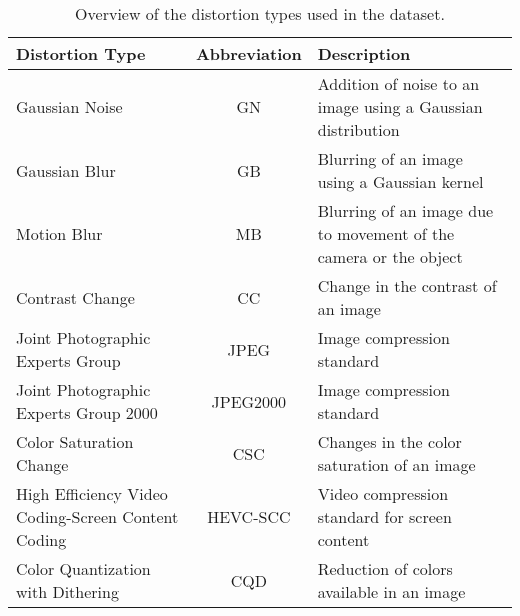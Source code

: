 \begin{table}[h!]
\centering
\caption{Overview of the distortion types used in the dataset.}
\begin{tabular}{|p{6cm}|c|p{6cm}|}
\hline
\textbf{Distortion Type} & \textbf{Abbreviation} & \textbf{Description} \\
\hline
\hline
Gaussian Noise & GN & Addition of noise to an image using a Gaussian distribution \\
\hline
Gaussian Blur & GB & Blurring of an image using a Gaussian kernel \\
\hline
Motion Blur & MB & Blurring of an image due to movement of the camera or the object \\
\hline
Contrast Change & CC & Change in the contrast of an image \\
\hline
Joint Photographic Experts Group & JPEG & Image compression standard \\
\hline
Joint Photographic Experts Group 2000 & JPEG2000 & Image compression standard \\
\hline
Color Saturation Change & CSC & Changes in the color saturation of an image \\
\hline
High Efficiency Video Coding-Screen Content Coding & HEVC-SCC & Video compression standard for screen content \\
\hline
Color Quantization with Dithering & CQD & Reduction of colors available in an image \\
\hline
\end{tabular}
\label{tab:distortion_types}
\end{table}


